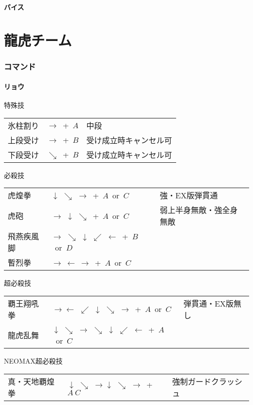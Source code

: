 \documentclass[a4j,11pt]{jarticle}
\def\hado{$\downarrow$ $\searrow$ $\rightarrow$}%
\def\syoryu{$\rightarrow$ $\downarrow$ $\searrow$}%
\def\yoga{$\leftarrow$ $\swarrow$ $\downarrow$ $\searrow$ $\rightarrow$}%
\def\gyakuyoga{$\rightarrow$ $\searrow$ $\downarrow$ $\swarrow$ $\leftarrow$}%
\def\ryuko{$\downarrow$ $\searrow$ $\rightarrow$ $\searrow$ $\downarrow$ $\swarrow$ $\leftarrow$}%
\begin{document}
\subsection{バイス}
\newpage
\part{龍虎チーム}%
\section{コマンド}
\subsection{リョウ}
\begin{itembox}[l]{特殊技}
\begin{tabular}{lll}
氷柱割り&$\rightarrow$\ +\ $A$&中段\\%
上段受け&$\rightarrow$\ +\ $B$&受け成立時キャンセル可\\%
下段受け&$\searrow$\ +\ $B$&受け成立時キャンセル可%
\end{tabular}
\end{itembox}
\begin{itembox}[l]{必殺技}
\begin{tabular}{lll}
虎煌拳&\hado\ +\ $A$\ or\ $C$&強・EX版弾貫通\\%
虎砲&\syoryu\ +\ $A$\ or\ $C$&弱上半身無敵・強全身無敵\\%
飛燕疾風脚&\gyakuyoga\ +\ $B$\ or\ $D$&\\%
暫烈拳&$\rightarrow\ \leftarrow\ \rightarrow$\ +\ $A$\ or\ $C$&%
\end{tabular}
\end{itembox}
\begin{itembox}[l]{超必殺技}
\begin{tabular}{lll}
覇王翔吼拳&$\rightarrow$\yoga\ +\ $A$\ or\ $C$&弾貫通・EX版無し\\%
龍虎乱舞&\ryuko\ +\ $A$\ or\ $C$&%
\end{tabular}
\end{itembox}
\begin{itembox}[l]{NEOMAX超必殺技}
\begin{tabular}{lll}
真・天地覇煌拳&\hado\hado\ +\ $A\ C$&強制ガードクラッシュ%
\end{tabular}
\end{itembox}
\newpage
\end{document}
